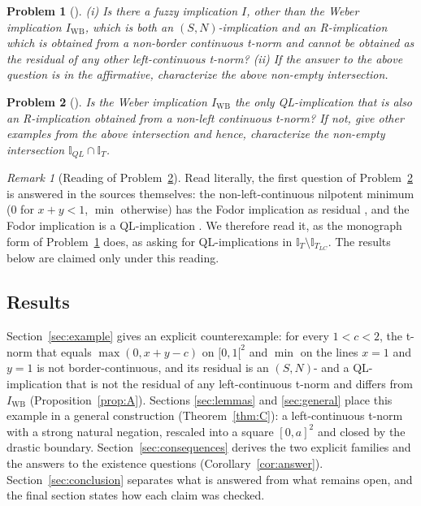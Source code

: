 \documentclass[11pt]{amsart}
\numberwithin{equation}{section}
\newtheorem{problem}{Problem}
\theoremstyle{definition}
\theoremstyle{remark}
\newtheorem{remark}[theorem]{Remark}
\newcommand{\IWB}{I_{\mathrm{WB}}}
\newcommand{\cI}{\mathbb{I}}
\newcommand{\Ioc}{[0,1[}
\begin{document}
\begin{problem}[{\cite[Problem~4.2]{BJ2013}}]\label{pr:sn}
\textup{(i)} Is there a fuzzy implication $I$, other than the Weber implication
$\IWB$, which is both an $(S,N)$-implication and an R-implication which is
obtained from a non-border continuous t-norm and cannot be obtained as the
residual of any other left-continuous t-norm?
\textup{(ii)} If the answer to the above question is in the affirmative, characterize
the above non-empty intersection.
\end{problem}

\begin{problem}[{\cite[Problem~4.5(ii)]{BJ2013}}]\label{pr:ql}
Is the Weber implication $\IWB$ the only QL-implication that is also an
R-implication obtained from a non-left continuous t-norm? If not, give other
examples from the above intersection and hence, characterize the non-empty
intersection $\cI_{QL}\cap\cI_T$.
\end{problem}

\begin{remark}[Reading of Problem~\ref{pr:ql}]\label{rem:reading}
Read literally, the first question of Problem~\ref{pr:ql} is answered in the
sources themselves: the non-left-continuous nilpotent minimum ($0$ for
$x+y<1$, $\min$ otherwise) has the Fodor implication as residual
\cite[p.~189]{BJ2013}, and the Fodor implication is a QL-implication
\cite[Table~6, Proposition~6.4]{BJ2010}. We therefore read it, as the
monograph form of Problem~\ref{pr:sn} does, as asking for QL-implications in
$\cI_T\setminus\cI_{T_{LC}}$. The results below are claimed only under this
reading.
\end{remark}

\subsection*{Results}
Section~\ref{sec:example} gives an explicit counterexample: for every
$1<c<2$, the t-norm that equals $\max(0,x+y-c)$ on $\Ioc^2$ and $\min$ on the
lines $x=1$ and $y=1$ is not border-continuous, and its residual is an
$(S,N)$- and a QL-implication that is not the residual of any left-continuous
t-norm and differs from $\IWB$ (Proposition~\ref{prop:A}). Sections
\ref{sec:lemmas} and \ref{sec:general} place this example in a general
construction (Theorem~\ref{thm:C}): a left-continuous t-norm with a strong
natural negation, rescaled into a square $[0,a]^2$ and closed by the drastic
boundary. Section~\ref{sec:consequences} derives the two explicit families and
the answers to the existence questions (Corollary~\ref{cor:answer}).
Section~\ref{sec:conclusion} separates what is answered from what remains
open, and the final section states how each claim was checked.
\end{document}
